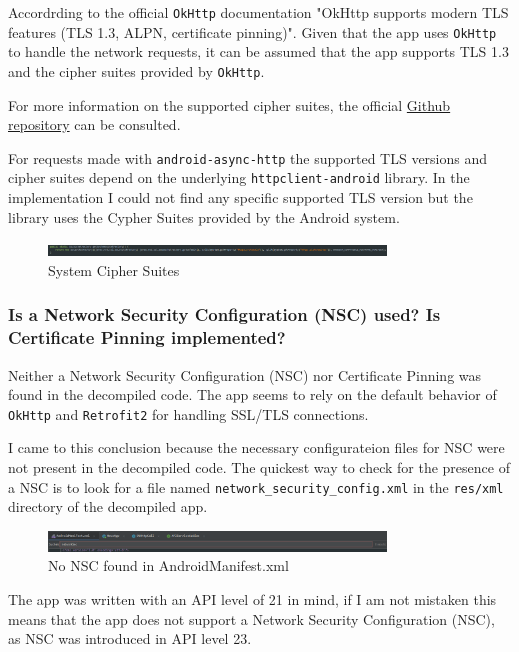 \documentclass[12pt,a4paper]{article}
\begin{document}
Accordrding to the official \texttt{OkHttp} documentation "OkHttp supports modern TLS features (TLS 1.3, ALPN, certificate pinning)".
Given that the app uses \texttt{OkHttp} to handle the network requests, it can be assumed that the app supports TLS 1.3 and the cipher suites provided by \texttt{OkHttp}.

For more information on the supported cipher suites, the official \href{https://github.com/square/okhttp}{Github repository} can be consulted.

For requests made with \texttt{android-async-http} the supported TLS versions and cipher suites depend on the underlying \texttt{httpclient-android} library. In the implementation I could not find any
specific supported TLS version but the library uses the Cypher Suites provided by the Android system.

\begin{figure}[H]
\centering
\includegraphics[width=0.8\textwidth]{./screenshots/system_cyphersuites.png}
\caption{System Cipher Suites}
\end{figure}

\subsubsection{Is a Network Security Configuration (NSC) used? Is Certificate Pinning implemented?}

Neither a Network Security Configuration (NSC) nor Certificate Pinning was found in the decompiled code. The app seems to rely on the default behavior of \texttt{OkHttp} and \texttt{Retrofit2} for handling SSL/TLS connections.

I came to this conclusion because the necessary configurateion files for NSC were not present in the decompiled code. The quickest way to check for the presence of a NSC is to look for a file named \texttt{network\_security\_config.xml} in the \texttt{res/xml} directory of the decompiled app.

\begin{figure}[H]
\centering
\includegraphics[width=0.8\textwidth]{./screenshots/no_nsc.png}
\caption{No NSC found in AndroidManifest.xml}
\end{figure}

The app was written with an API level of 21 in mind, if I am not mistaken this means that the app does not support a Network Security Configuration (NSC), as NSC was introduced in API level 23.
\end{document}
